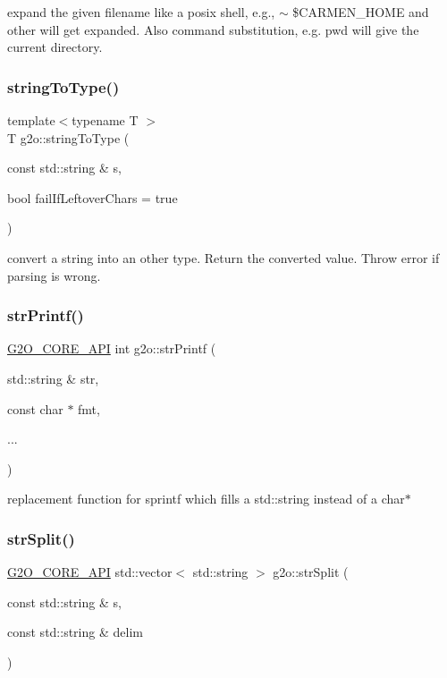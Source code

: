 expand the given filename like a posix shell, e.\+g., $\sim$ \$\+C\+A\+R\+M\+E\+N\+\_\+\+H\+O\+ME and other will get expanded. Also command substitution, e.\+g. {\ttfamily pwd} will give the current directory. \mbox{\label{group__utils_ga9dac39a213d269b8d68fb698bf82873a}} 
\subsubsection{\texorpdfstring{string\+To\+Type()}{stringToType()}}
{\footnotesize\ttfamily template$<$typename T $>$ \\
T g2o\+::string\+To\+Type (\begin{DoxyParamCaption}\item[{const std\+::string \&}]{s,  }\item[{bool}]{fail\+If\+Leftover\+Chars = {\ttfamily true} }\end{DoxyParamCaption})}

convert a string into an other type. Return the converted value. Throw error if parsing is wrong. \mbox{\label{group__utils_gacce5cae59e8c97bf3f4ff581c6534d03}} 
\subsubsection{\texorpdfstring{str\+Printf()}{strPrintf()}}
{\footnotesize\ttfamily \mbox{\hyperlink{g2o__core__api_8h_a7a8d7648d6f1e26632566f335751d064}{G2\+O\+\_\+\+C\+O\+R\+E\+\_\+\+A\+PI}} int g2o\+::str\+Printf (\begin{DoxyParamCaption}\item[{std\+::string \&}]{str,  }\item[{const char $\ast$}]{fmt,  }\item[{}]{... }\end{DoxyParamCaption})}

replacement function for sprintf which fills a std\+::string instead of a char$\ast$ \mbox{\label{group__utils_ga0a56de67e98afa3f8307e7b4ddb4cc83}} 
\subsubsection{\texorpdfstring{str\+Split()}{strSplit()}}
{\footnotesize\ttfamily \mbox{\hyperlink{g2o__core__api_8h_a7a8d7648d6f1e26632566f335751d064}{G2\+O\+\_\+\+C\+O\+R\+E\+\_\+\+A\+PI}} std\+::vector$<$ std\+::string $>$ g2o\+::str\+Split (\begin{DoxyParamCaption}\item[{const std\+::string \&}]{s,  }\item[{const std\+::string \&}]{delim }\end{DoxyParamCaption})}

